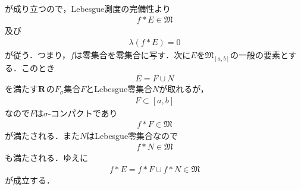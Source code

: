\begin{sketch}
\begin{align}
		\end{align}
		が成り立つので，Lebesgue測度の完備性より
		\begin{align}
			f \ast E \in \mathfrak{M}
		\end{align}
		及び
		\begin{align}
			\lambda(f \ast E) = 0
		\end{align}
		が従う．つまり，$f$は零集合を零集合に写す．次に$E$を$\mathfrak{M}_{[a,b]}$の一般の要素とする．このとき
		\begin{align}
			E = F \cup N
		\end{align}
		を満たす$\mathbf{R}$の$F_\sigma$集合$F$とLebesgue零集合$N$が取れるが，
		\begin{align}
			F \subset [a,b]
		\end{align}
		なので$F$は$\sigma$-コンパクトであり
		\begin{align}
			f \ast F \in \mathfrak{M}
		\end{align}
		が満たされる．また$N$はLebesgue零集合なので
		\begin{align}
			f \ast N \in \mathfrak{M}
		\end{align}
		も満たされる．ゆえに
		\begin{align}
			f \ast E = f \ast F \cup f \ast N \in \mathfrak{M}
		\end{align}
		が成立する．
		\QED
	\end{sketch}
	
	\begin{screen}
		\begin{thm}[絶対連続関数の総変動関数も絶対連続である]
			
		\end{thm}
	\end{screen}
	
	\begin{screen}
		\begin{thm}[微分積分学の基本定理]\label{thm:the_fundamental_theorem_of_calculus}
		\end{thm}
	\end{screen}
	
